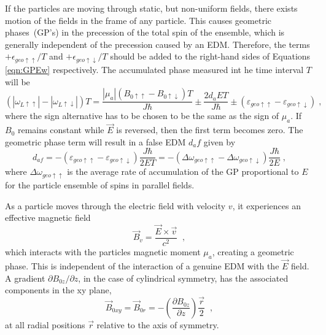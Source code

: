 If the particles are moving through static, but non-uniform fields,
there exists motion of the fields in the frame of any particle.  This
causes geometric phases~(GP's) in the precession of the total spin of
the ensemble, which is generally independent of the precession caused
by an EDM. Therefore, the terms $+\epsilon_{geo\uparrow\uparrow}/T$
and $+\epsilon_{geo\uparrow\downarrow}/T$ should be added to the
right-hand sides of Equations \ref{eqn:GPEw} respectively.  The
accumulated phase measured int he time interval $T$ will be
%
\begin{equation}
(|\omega_{L\uparrow\uparrow}| - |\omega_{L\uparrow\downarrow}|)T = \frac{|\mu_a|(B_{0\uparrow\uparrow} - B_{0\uparrow\downarrow})T}{J\hbar} \pm \frac{2 d_{a} E T}{J \hbar} \pm (\varepsilon_{geo\uparrow\uparrow} -\varepsilon_{geo\uparrow\downarrow}) \;,
\end{equation}
%
where the sign alternative has to be chosen to be the same as the sign
of $\mu_a$.  If $B_0$ remains constant while $\vec{E}$ is reversed,
then the first term becomes zero. The geometric phase term will result
in a false EDM $d_af$ given by
%
\begin{equation}
\label{eqn:daf}
d_{af} = -(\varepsilon_{geo\uparrow\uparrow} -\varepsilon_{geo\uparrow\downarrow})\frac{J\hbar}{2 E T} = -(\Delta \omega_{geo\uparrow\uparrow} - \Delta \omega_{geo\uparrow\downarrow})\frac{J\hbar}{2E} \; ,
\end{equation}
%
where $\Delta \omega_{geo\uparrow\uparrow}$ is the average rate of
accumulation of the GP proportional to $E$ for the particle ensemble
of spins in parallel fields.

As a particle moves through the electric field with velocity $v$, it
experiences an effective magnetic field
%
\begin{equation}
\label{eqn:Bv}
\vec{B}_v = \frac{\vec{E} \times \vec{v}}{c^2} \;\;,
\end{equation}
%
which interacts with the particles magnetic moment $\mu_a$, creating a
geometric phase.  This is independent of the interaction of a genuine
EDM with the $\vec{E}$ field.
%
A gradient $\partial B_{0z}/\partial z$, in the case of cylindrical
symmetry, has the associated components in the xy plane,
%
\begin{equation}
\label{eqn:Bxy}
\vec{B}_{0xy} = \vec{B}_{0r} = - \left( \frac{\partial B_{0z}}{\partial z} \right) \frac{\vec{r}}{2} \;\; ,
\end{equation} 
%
at all radial positions $\vec{r}$ relative to the axis of symmetry.

